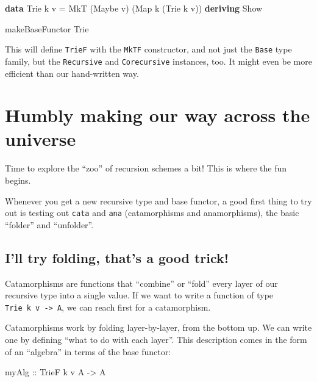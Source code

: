 \documentclass[]{article}
\newenvironment{Shaded}{}{}
\newcommand{\DataTypeTok}[1]{\textcolor[rgb]{0.56,0.13,0.00}{#1}}
\newcommand{\KeywordTok}[1]{\textcolor[rgb]{0.00,0.44,0.13}{\textbf{#1}}}
\newcommand{\NormalTok}[1]{#1}
\newcommand{\OtherTok}[1]{\textcolor[rgb]{0.00,0.44,0.13}{#1}}
\begin{document}
\begin{Shaded}
\begin{Highlighting}[]
\KeywordTok{data} \DataTypeTok{Trie}\NormalTok{ k v }\OtherTok{=} \DataTypeTok{MkT}\NormalTok{ (}\DataTypeTok{Maybe}\NormalTok{ v) (}\DataTypeTok{Map}\NormalTok{ k (}\DataTypeTok{Trie}\NormalTok{ k v))}
  \KeywordTok{deriving} \DataTypeTok{Show}

\NormalTok{makeBaseFunctor \textquotesingle{}}\DataTypeTok{\textquotesingle{}Trie}
\end{Highlighting}
\end{Shaded}

This will define \texttt{TrieF} with the \texttt{MkTF} constructor, and not just
the \texttt{Base} type family, but the \texttt{Recursive} and
\texttt{Corecursive} instances, too. It might even be more efficient than our
hand-written way.

\section{Humbly making our way across the
universe}\label{humbly-making-our-way-across-the-universe}

Time to explore the ``zoo'' of recursion schemes a bit! This is where the fun
begins.

Whenever you get a new recursive type and base functor, a good first thing to
try out is testing out \texttt{cata} and \texttt{ana} (catamorphisms and
anamorphisms), the basic ``folder'' and ``unfolder''.

\subsection{I'll try folding, that's a good
trick!}\label{ill-try-folding-thats-a-good-trick}

Catamorphisms are functions that ``combine'' or ``fold'' every layer of our
recursive type into a single value. If we want to write a function of type
\texttt{Trie\ k\ v\ -\textgreater{}\ A}, we can reach first for a catamorphism.

Catamorphisms work by folding layer-by-layer, from the bottom up. We can write
one by defining ``what to do with each layer''. This description comes in the
form of an ``algebra'' in terms of the base functor:

\begin{Shaded}
\begin{Highlighting}[]
\OtherTok{myAlg ::} \DataTypeTok{TrieF}\NormalTok{ k v }\DataTypeTok{A} \OtherTok{{-}\textgreater{}} \DataTypeTok{A}
\end{Highlighting}
\end{Shaded}
\end{document}
